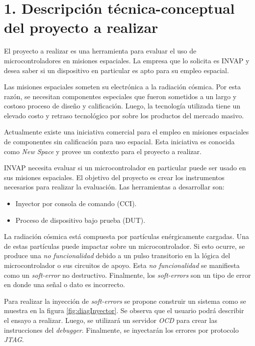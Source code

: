 \documentclass[
11pt, %
]{charter}
\begin{document}
\section{1. Descripción técnica-conceptual del proyecto a realizar}
\label{sec:descripcion}

El proyecto a realizar es una herramienta para evaluar el uso de microcontroladores en misiones espaciales.
La empresa que lo solicita es INVAP y desea saber si un dispositivo en particular es apto para su empleo espacial.

Las misiones espaciales someten su electrónica a la radiación cósmica.
Por esta razón, se necesitan componentes especiales que fueron sometidos a un largo y costoso proceso de diseño y calificación.
Luego, la tecnología utilizada tiene un elevado costo y retraso tecnológico por sobre los productos del mercado masivo.

Actualmente existe una iniciativa comercial para el empleo en misiones espaciales de componentes sin calificación para uso espacial.
Esta iniciativa es conocida como \emph{New Space} y provee un contexto para el proyecto a realizar.

INVAP necesita evaluar si un microcontrolador en particular puede ser usado en sus misiones espaciales.
El objetivo del proyecto es crear los instrumentos necesarios para realizar la evaluación.
Las herramientas a desarrollar son:

\begin{itemize}
	\item Inyector por consola de comando (CCI).
	\item Proceso de dispositivo bajo prueba (DUT).
\end{itemize}

La radiación cósmica está compuesta por partículas enérgicamente cargadas.
Una de estas partículas puede impactar sobre un microcontrolador.
Si esto ocurre, se produce una \emph{no funcionalidad} debido a un pulso transitorio en la lógica del microcontrolador o sus circuitos de apoyo.
Esta \emph{no funcionalidad} se manifiesta como un \emph{soft-error} no destructivo.
Finalmente, los \emph{soft-errors} son un tipo de error en donde una señal o dato es incorrecto.

Para realizar la inyección de \emph{soft-errors} se propone construir un sistema como se muestra en la figura \ref{fig:diagInyector}.
Se observa que el usuario podrá describir el ensayo a realizar.
Luego, se utilizará un servidor \emph{OCD} para crear las instrucciones del \emph{debugger}.
Finalmente, se inyectarán los errores por protocolo \emph{JTAG}.
\end{document}
